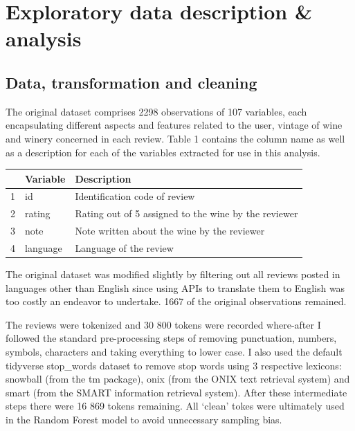\documentclass[11pt,preprint]{elsarticle}
\let\origtable\table
\let\endorigtable\endtable
\renewenvironment{table}[1][2] {
    \expandafter\origtable\expandafter[H]
} {
    \endorigtable
}
\numberwithin{equation}{section}
\numberwithin{figure}{section}
\numberwithin{table}{section}
\begin{document}
\newpage

\section{Exploratory data description \&
analysis}\label{exploratory-data-description-analysis}

\label{Data}

\subsection{Data, transformation and
cleaning}\label{data-transformation-and-cleaning}

The original dataset comprises 2298 observations of 107 variables, each
encapsulating different aspects and features related to the user,
vintage of wine and winery concerned in each review. Table 1 contains
the column name as well as a description for each of the variables
extracted for use in this analysis.

\begin{table}[ht]
\centering
\begin{tabular}{|r|l|l|}
\hline
\textbf{} & \textbf{Variable} & \textbf{Description} \\
\hline
1 & id & Identification code of review \\
2 & rating & Rating out of 5 assigned to the wine by the reviewer \\
3 & note & Note written about the wine by the reviewer \\
4 & language & Language of the review \\
\hline
\end{tabular}
\caption{Description of Variables}
\label{tab:variables}
\end{table}

The original dataset was modified slightly by filtering out all reviews
posted in languages other than English since using APIs to translate
them to English was too costly an endeavor to undertake. 1667 of the
original observations remained.

The reviews were tokenized and 30 800 tokens were recorded where-after I
followed the standard pre-processing steps of removing punctuation,
numbers, symbols, characters and taking everything to lower case. I also
used the default tidyverse stop\_words dataset to remove stop words
using 3 respective lexicons: snowball (from the tm package), onix (from
the ONIX text retrieval system) and smart (from the SMART information
retrieval system). After these intermediate steps there were 16 869
tokens remaining. All `clean' tokes were ultimately used in the Random
Forest model to avoid unnecessary sampling bias.
\end{document}

